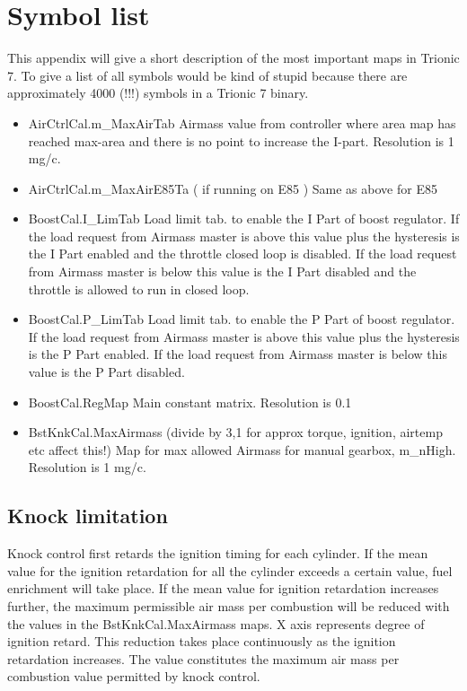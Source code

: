 \documentclass[11pt,a4paper]{book}
\begin{document}
\appendix
\chapter{Symbol list}
This appendix will give a short description of the most important maps in
Trionic 7. To give a list of all symbols would be kind of stupid because there
are approximately 4000 (!!!) symbols in a Trionic 7 binary.

\begin{itemize}
    \item
        AirCtrlCal.m\_MaxAirTab
        Airmass value from controller where area map has reached max-area and there is no point to increase
        the I-part. Resolution is 1 mg/c.
    \item
        AirCtrlCal.m\_MaxAirE85Ta ( if running on E85 )
        Same as above for E85
    \item
        BoostCal.I\_LimTab
        Load limit tab. to enable the I Part of boost regulator. If the load request
        from Airmass master is above this value plus the hysteresis is the I Part
        enabled and the throttle closed loop is disabled. If the load request from
        Airmass master is below this value is the I Part disabled and the throttle is
        allowed to run in closed loop.
    \item
        BoostCal.P\_LimTab
        Load limit tab. to enable the P Part of boost regulator. If the load request
        from Airmass master is above this value plus the hysteresis is the P Part
        enabled. If the load request from Airmass master is below this value is the P
        Part disabled.
    \item
        BoostCal.RegMap
        Main constant matrix. Resolution is 0.1 %
    \item
        BstKnkCal.MaxAirmass (divide by 3,1 for approx torque, ignition, airtemp etc
        affect this!) Map for max allowed Airmass for manual gearbox, m\_nHigh.
        Resolution is 1 mg/c.
\end{itemize}
\section{Knock limitation}
Knock control first retards the ignition timing for each cylinder. If the mean
value for the ignition retardation for all the cylinder exceeds a certain value,
fuel enrichment will take place. If the mean value for ignition retardation
increases further, the maximum permissible air mass per combustion will be
reduced with the values in the BstKnkCal.MaxAirmass maps. X axis represents
degree of ignition retard. This reduction takes place continuously as the
ignition retardation increases. The value constitutes the maximum air mass per
combustion value permitted by knock control.
\end{document}

